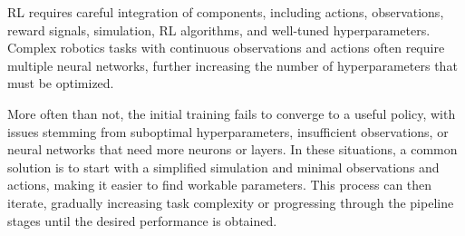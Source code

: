 RL requires careful integration of components, including actions, observations, reward signals, simulation, RL algorithms, and well-tuned hyperparameters. Complex robotics tasks with continuous observations and actions often require multiple neural networks, further increasing the number of hyperparameters that must be optimized.

More often than not, the initial training fails to converge to a useful policy, with issues stemming from suboptimal hyperparameters, insufficient observations, or neural networks that need more neurons or layers. In these situations, a common solution is to start with a simplified simulation and minimal observations and actions, making it easier to find workable parameters. This process can then iterate, gradually increasing task complexity or progressing through the pipeline stages until the desired performance is obtained.




